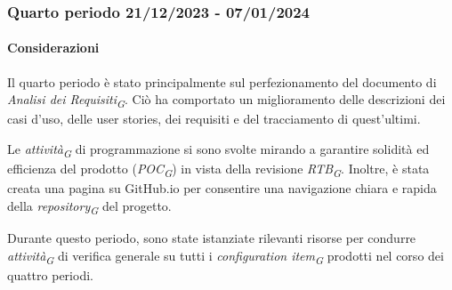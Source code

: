 

\subsubsection{Quarto periodo  21/12/2023 - 07/01/2024}
\paragraph{Considerazioni}
Il quarto periodo è stato principalmente sul perfezionamento del documento di \textit{Analisi dei Requisiti}\textsubscript{\textit{G}}. Ciò ha comportato un miglioramento delle descrizioni dei casi d'uso, delle user stories, dei requisiti e del tracciamento di quest'ultimi.

Le \textit{attività}\textsubscript{\textit{G}} di programmazione si sono svolte mirando a garantire solidità ed efficienza del prodotto (\textit{POC}\textsubscript{\textit{G}}) in vista della revisione \textit{RTB}\textsubscript{\textit{G}}. 
Inoltre, è stata creata una pagina su GitHub.io per consentire una navigazione chiara e rapida della \textit{repository}\textsubscript{\textit{G}} del progetto.

Durante questo periodo, sono state istanziate rilevanti risorse per condurre \textit{attività}\textsubscript{\textit{G}} di verifica generale su tutti i \textit{configuration item}\textsubscript{\textit{G}} prodotti nel corso dei quattro periodi.

